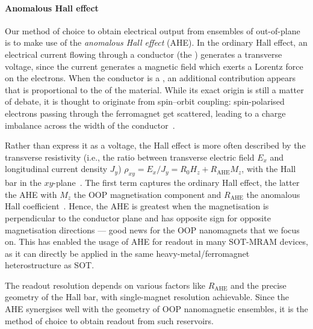 \paragraph{Anomalous Hall effect}
Our method of choice to obtain electrical output from ensembles of out-of-plane  is to make use of the \emph{anomalous Hall effect} (AHE).
In the ordinary Hall effect, an electrical current flowing through a conductor (the ) generates a transverse voltage, since the current generates a magnetic field which exerts a Lorentz force on the electrons.
When the conductor is a , an additional contribution appears that is proportional to the  of the material.
While its exact origin is still a matter of debate, it is thought to originate from spin--orbit coupling: spin-polarised electrons passing through the ferromagnet get scattered, leading to a charge imbalance across the width of the conductor~\cite{AHE_Culcer,AHE}. \par
Rather than express it as a voltage, the Hall effect is more often described by the transverse resistivity (i.e., the ratio between transverse electric field $E_x$ and longitudinal current density $J_y$) $\rho_{xy} = E_x/J_y = R_0 H_z + R_\mathrm{AHE} M_z$, with the Hall bar in the $xy$-plane~\cite{SHE,AHE}.
The first term captures the ordinary Hall effect, the latter the AHE with $M_z$ the OOP magnetisation component and $R_\mathrm{AHE}$ the anomalous Hall coefficient~\cite{AHE}.
Hence, the AHE is greatest when the magnetisation is perpendicular to the conductor plane and has opposite sign for opposite magnetisation directions --- good news for the OOP nanomagnets that we focus on.
This has enabled the usage of AHE for readout in many SOT-MRAM devices, as it can directly be applied in the same heavy-metal/ferromagnet heterostructure as SOT. \par
The readout resolution depends on various factors like $R_\mathrm{AHE}$ and the precise geometry of the Hall bar, with single-magnet resolution achievable. %
Since the AHE synergises well with the geometry of OOP nanomagnetic ensembles, it is the method of choice to obtain readout from such reservoirs.

